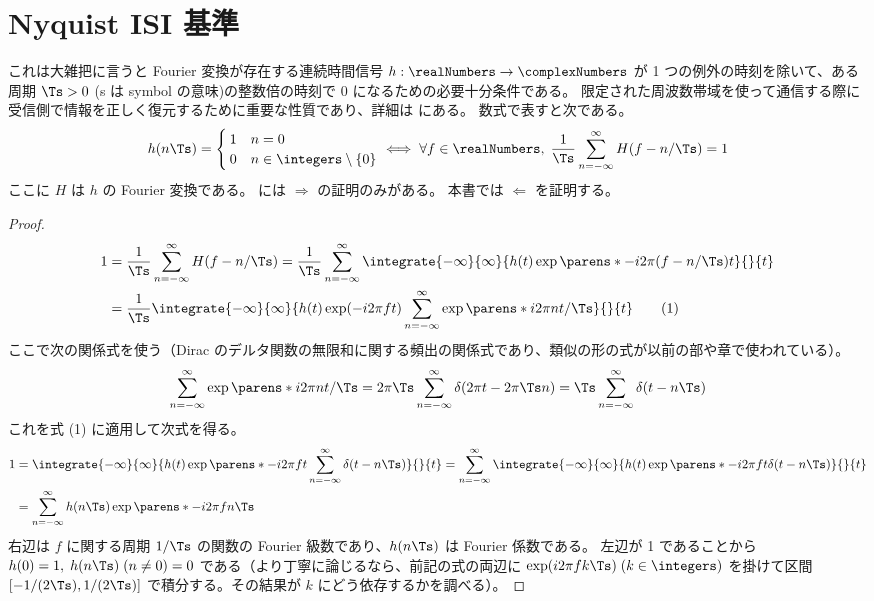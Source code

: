 \chapter{Nyquist ISI 基準}
    これは大雑把に言うと Fourier 変換が存在する連続時間信号 $h:\realNumbers\to\complexNumbers$ が 1 つの例外の時刻を除いて、ある周期 $\Ts>0$ (s は symbol の意味)の整数倍の時刻で 0 になるための必要十分条件である。
    限定された周波数帯域を使って通信する際に受信側で情報を正しく復元するために重要な性質であり、詳細は \cite{Nyquist_ISI_crit} にある。
    数式で表すと次である。
    \[
        h(n\Ts) = \begin{cases}
            1 & n=0 \\
            0 & n\in\integers\setminus\{0\}
        \end{cases}
        \iff \forall f\in\realNumbers,\;\frac{1}{\Ts}\sum_{n=-\infty}^\infty H(f-n/\Ts) = 1
    \]
    ここに $H$ は $h$ の Fourier 変換である。
    \cite{Nyquist_ISI_crit} には $\Rightarrow$ の証明のみがある。
    本書では $\Leftarrow$ を証明する。
    \begin{proof}
        \begin{align*}
            1 &= \frac{1}{\Ts}\sum_{n=-\infty}^\infty H(f-n/\Ts) = \frac{1}{\Ts}\sum_{n=-\infty}^\infty\integrate{-\infty}{\infty}{h(t)\exp\parens*{-i2\pi(f-n/\Ts)t}}{}{t} \\
            &= \frac{1}{\Ts}\integrate{-\infty}{\infty}{h(t)\exp(-i2\pi ft)\sum_{n=-\infty}^\infty\exp\parens*{i2\pi nt/\Ts}}{}{t} \tag{1}
        \end{align*}
        ここで次の関係式を使う（Dirac のデルタ関数の無限和に関する頻出の関係式であり、類似の形の式が以前の部や章で使われている）。
        \[ \sum_{n=-\infty}^\infty\exp\parens*{i2\pi nt/\Ts} = 2\pi\Ts\sum_{n=-\infty}^\infty\delta(2\pi t-2\pi\Ts n) = \Ts\sum_{n=-\infty}^\infty\delta(t-n\Ts) \]
        これを式 (1) に適用して次式を得る。
        \begin{align*}
            1 &= \integrate{-\infty}{\infty}{h(t)\exp\parens*{-i2\pi ft}\sum_{n=-\infty}^\infty\delta(t-n\Ts)}{}{t} = \sum_{n=-\infty}^\infty\integrate{-\infty}{\infty}{h(t)\exp\parens*{-i2\pi ft}\delta(t-n\Ts)}{}{t} \\
            &= \sum_{n=-\infty}^\infty h(n\Ts)\exp\parens*{-i2\pi fn\Ts}
        \end{align*}
        右辺は $f$ に関する周期 $1/\Ts$ の関数の Fourier 級数であり、$h(n\Ts)$ は Fourier 係数である。
        左辺が 1 であることから $h(0) = 1,\;h(n\Ts)\;(n\neq 0) = 0$ である（より丁寧に論じるなら、前記の式の両辺に $\exp(i2\pi fk\Ts)\;(k\in\integers)$ を掛けて区間 $[-1/(2\Ts),1/(2\Ts)]$ で積分する。その結果が $k$ にどう依存するかを調べる）。
    \end{proof}